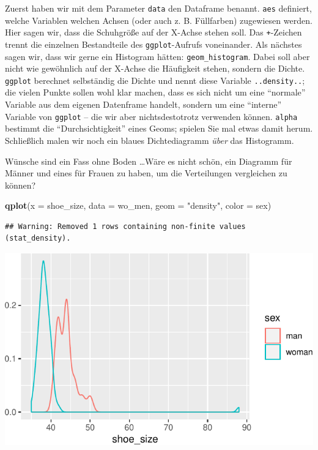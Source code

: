 \documentclass[12pt,ngerman,paper=a4,pagesize,DIV=13]{scrreprt}
\newenvironment{Shaded}{\begin{snugshade}}{\end{snugshade}}
\newcommand{\DataTypeTok}[1]{\textcolor[rgb]{0.13,0.29,0.53}{#1}}
\newcommand{\KeywordTok}[1]{\textcolor[rgb]{0.13,0.29,0.53}{\textbf{#1}}}
\newcommand{\NormalTok}[1]{#1}
\newcommand{\StringTok}[1]{\textcolor[rgb]{0.31,0.60,0.02}{#1}}
\begin{document}
Zuerst haben wir mit dem Parameter \texttt{data} den Dataframe benannt.
\texttt{aes} definiert, welche Variablen welchen Achsen (oder auch z. B.
Füllfarben) zugewiesen werden. Hier sagen wir, dass die Schuhgröße auf
der X-Achse stehen soll. Das \texttt{+}-Zeichen trennt die einzelnen
Bestandteile des \texttt{ggplot}-Aufrufs voneinander. Als nächstes sagen
wir, dass wir gerne ein Histogram hätten: \texttt{geom\_histogram}.
Dabei soll aber nicht wie gewöhnlich auf der X-Achse die Häufigkeit
stehen, sondern die Dichte. \texttt{ggplot} berechnet selbständig die
Dichte und nennt diese Variable \texttt{..density..}; die vielen Punkte
sollen wohl klar machen, dass es sich nicht um eine \enquote{normale}
Variable aus dem eigenen Datenframe handelt, sondern um eine
\enquote{interne} Variable von \texttt{ggplot} -- die wir aber
nichtsdestotrotz verwenden können. \texttt{alpha} bestimmt die
\enquote{Durchsichtigkeit} eines Geoms; spielen Sie mal etwas damit
herum. Schließlich malen wir noch ein blaues Dichtediagramm \emph{über}
das Histogramm.

Wünsche sind ein Fass ohne Boden \dots Wäre es nicht schön, ein Diagramm
für Männer und eines für Frauen zu haben, um die Verteilungen
vergleichen zu können?

\begin{Shaded}
\begin{Highlighting}[]
\KeywordTok{qplot}\NormalTok{(}\DataTypeTok{x =}\NormalTok{ shoe_size, }\DataTypeTok{data =}\NormalTok{ wo_men, }\DataTypeTok{geom =} \StringTok{"density"}\NormalTok{, }\DataTypeTok{color =}\NormalTok{ sex)}
\end{Highlighting}
\end{Shaded}

\begin{verbatim}
## Warning: Removed 1 rows containing non-finite values (stat_density).
\end{verbatim}

\includegraphics{DatenerhebungStatistik-Uebung_files/figure-latex/unnamed-chunk-242-1.pdf}
\end{document}
